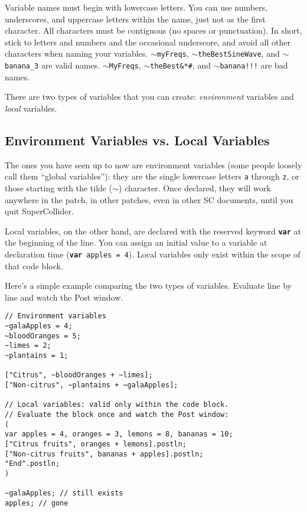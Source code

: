 Variable names must begin with lowercase letters. You can use numbers, underscores, and uppercase letters within the name, just not as the first character. All characters must be contiguous (no spaces or punctuation). In short, stick to letters and numbers and the occasional underscore, and avoid all other characters when naming your variables. \texttt{$\sim$myFreqs}, \texttt{$\sim$theBestSineWave}, and \texttt{$\sim$banana\_3} are valid names. \texttt{$\sim$MyFreqs}, \texttt{$\sim$theBest\&*\#\@SineWave}, and \texttt{$\sim$banana!!!} are bad names.

There are two types of variables that you can create: \emph{environment} variables and \emph{local} variables.

\subsection{Environment Variables vs. Local Variables}

The ones you have seen up to now are environment variables (some people loosely call them ``global variables''): they are the single lowercase letters \texttt{a} through \texttt{z}, or those starting with the tilde ($\sim$) character. Once declared, they will work anywhere in the patch, in other patches, even in other SC documents, until you quit SuperCollider.

Local variables, on the other hand, are declared with the reserved keyword \texttt{\textbf{var}} at the beginning of the line. You can assign an initial value to a variable at declaration time (\texttt{\textbf{var} apples = 4}). Local variables only exist within the scope of that code block.

Here's a simple example comparing the two types of variables. Evaluate line by line and watch the Post window.

 
\begin{lstlisting}[style=SuperCollider-IDE, basicstyle=\scttfamily\footnotesize]
// Environment variables
~galaApples = 4;
~bloodOranges = 5;
~limes = 2;
~plantains = 1;

["Citrus", ~bloodOranges + ~limes];
["Non-citrus", ~plantains + ~galaApples];

// Local variables: valid only within the code block.
// Evaluate the block once and watch the Post window:
(
var apples = 4, oranges = 3, lemons = 8, bananas = 10;
["Citrus fruits", oranges + lemons].postln;
["Non-citrus fruits", bananas + apples].postln;
"End".postln;
)

~galaApples; // still exists
apples; // gone
\end{lstlisting}

